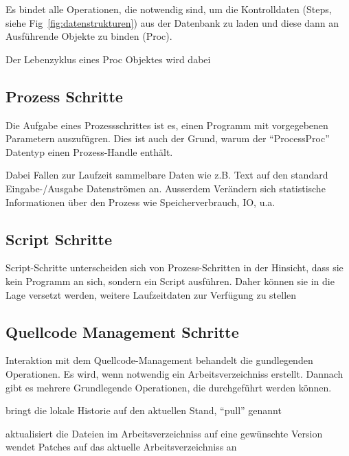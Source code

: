 Es bindet alle Operationen, die notwendig sind,
um die Kontrolldaten (Steps, siehe Fig~\ref{fig:datenstrukturen})
aus der Datenbank zu laden und diese dann an Ausf\"uhrende Objekte zu binden (Proc).

Der Lebenzyklus eines Proc Objektes wird dabei


\subsection{Prozess Schritte}

Die Aufgabe eines Prozessschrittes ist es,
einen Programm mit vorgegebenen Parametern auszuf\"ugren.
Dies ist auch der Grund, warum der ``ProcessProc'' Datentyp einen
Prozess-Handle enth\"alt.

Dabei Fallen zur Laufzeit sammelbare Daten wie z.B. Text auf den standard Eingabe-/Ausgabe Datenstr\"omen an.
Ausserdem Ver\"andern sich statistische Informationen \"uber den Prozess wie Speicherverbrauch, IO, u.a.


\subsection{Script Schritte}

Script-Schritte unterscheiden sich von Prozess-Schritten in der Hinsicht,
dass sie kein Programm an sich, sondern ein Script ausf\"uhren.
Daher k\"onnen sie in die Lage versetzt werden,
weitere Laufzeitdaten zur Verf\"ugung zu stellen


\subsection{Quellcode Management Schritte}

Interaktion mit dem Quellcode-Management behandelt die gundlegenden Operationen.
Es wird, wenn notwendig ein Arbeitsverzeichniss erstellt.
Dannach gibt es mehrere Grundlegende Operationen, die durchgef\"uhrt werden k\"onnen.

\begin{description}
        bringt die lokale Historie auf den aktuellen Stand, ``pull'' genannt

        aktualisiert die Dateien im Arbeitsverzeichniss
        auf eine gew\"unschte Version
        wendet Patches auf das aktuelle Arbeitsverzeichniss an
\end{description}

